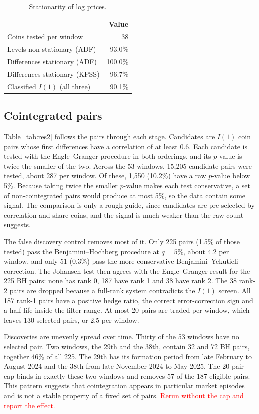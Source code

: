 \documentclass[10pt,a4paper,twocolumn]{article}
\newcommand{\TBD}[1]{\textcolor{red}{#1}}
\begin{document}
\begin{table}[htbp]
	\centering
	\small
	\caption{Stationarity of log prices.}
	\label{tab:res1}
	\begin{tabularx}{\columnwidth}{@{}Xr@{}}
		\toprule
		& Value \\
		\midrule
		Coins tested per window & 38 \\
		Levels non-stationary (ADF) & 93.0\% \\
		Differences stationary (ADF) & 100.0\% \\
		Differences stationary (KPSS) & 96.7\% \\
		Classified $I(1)$ (all three) & 90.1\% \\
		\bottomrule
	\end{tabularx}
\end{table}

\subsection{Cointegrated pairs}
Table~\ref{tab:res2} follows the pairs through each stage. Candidates are $I(1)$ coin pairs whose first differences have a correlation of at least 0.6. Each candidate is tested with the Engle--Granger procedure in both orderings, and its $p$-value is twice the smaller of the two. Across the 53 windows, 15{,}205 candidate pairs were tested, about 287 per window. Of these, 1{,}550 (10.2\%) have a raw $p$-value below 5\%. Because taking twice the smaller $p$-value makes each test conservative, a set of non-cointegrated pairs would produce at most 5\%, so the data contain some signal. The comparison is only a rough guide, since candidates are pre-selected by correlation and share coins, and the signal is much weaker than the raw count suggests.

The false discovery control removes most of it. Only 225 pairs (1.5\% of those tested) pass the Benjamini--Hochberg procedure at $q=5\%$, about 4.2 per window, and only 51 (0.3\%) pass the more conservative Benjamini--Yekutieli correction. The Johansen test then agrees with the Engle--Granger result for the 225 BH pairs: none has rank 0, 187 have rank 1 and 38 have rank 2. The 38 rank-2 pairs are dropped because a full-rank system contradicts the $I(1)$ screen. All 187 rank-1 pairs have a positive hedge ratio, the correct error-correction sign and a half-life inside the filter range. At most 20 pairs are traded per window, which leaves 130 selected pairs, or 2.5 per window.

Discoveries are unevenly spread over time. Thirty of the 53 windows have no selected pair. Two windows, the 29th and the 38th, contain 32 and 72 BH pairs, together 46\% of all 225. The 29th has its formation period from late February to August 2024 and the 38th from late November 2024 to May 2025. The 20-pair cap binds in exactly these two windows and removes 57 of the 187 eligible pairs. This pattern suggests that cointegration appears in particular market episodes and is not a stable property of a fixed set of pairs. \TBD{Rerun without the cap and report the effect.}
\end{document}

